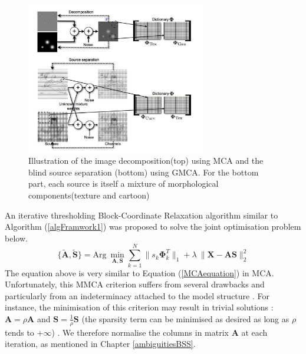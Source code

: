 \begin{figure}[!htbp]
\centering
\includegraphics[width=0.7\textwidth]{images/mca_gmca.png}
\caption{Illustration of the image decomposition(top) using MCA and the blind source separation (bottom) using GMCA. For the bottom part, each source is itself a mixture of morphological components(texture and cartoon)}
\label{illu_mca_and_gmca}
\end{figure}

An iterative thresholding Block-Coordinate Relaxation algorithm similar to Algorithm (\ref{algFramwork1}) was proposed to solve the joint optimisation problem below.
\begin{equation}
    \{\mathbf{\tilde{A},\tilde{S}}\} = \text{Arg} \: \min_{\mathbf{A},\mathbf{S}}\sum_{k=1}^N \lVert s_k \mathbf{\Phi}_k^T \rVert_{1} + \lambda \:\lVert \mathbf{X} - \mathbf{AS} \rVert^2_2
    \label{MMCAequation}
\end{equation}
The equation above is very similar to Equation (\ref{MCAequation}) in MCA. Unfortunately, this MMCA criterion suffers from several drawbacks and particularly from an indeterminacy attached to the model structure \cite{BobinJ_2007SaMD}. For instance, the minimisation of this criterion may result in trivial solutions : $\mathbf{A} = \rho \mathbf{A}$ and $\mathbf{S} = \frac{1}{\rho} \mathbf{S}$ (the sparsity term can be minimised as desired as long as $\rho$ tends to $+\infty$) \cite{BobinJ_2007SaMD}. We therefore normalise the columns in matrix $\mathbf{A}$ at each iteration, as mentioned in Chapter \ref{ambiguitiesBSS}.\\

